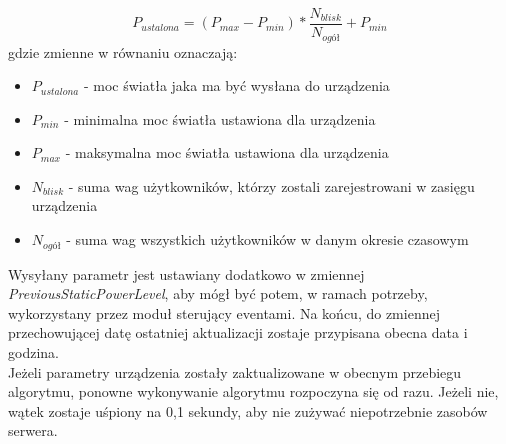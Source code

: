 \begin{equation}
P_{ustalona} = (P_{max} - P_{min}) * \frac{N_{blisk}}{N_{ogół}} + P_{min}
\end{equation}
gdzie zmienne w równaniu oznaczają:
\begin{itemize}
	\item $P_{ustalona}$ - moc światła jaka ma być wysłana do urządzenia
	\item $P_{min}$ - minimalna moc światła ustawiona dla urządzenia
	\item $P_{max}$ - maksymalna moc światła ustawiona dla urządzenia
	\item $N_{blisk}$ - suma wag użytkowników, którzy zostali zarejestrowani w zasięgu urządzenia
	\item $N_{ogół}$ - suma wag wszystkich użytkowników w danym okresie czasowym
\end{itemize}
Wysyłany parametr jest ustawiany dodatkowo w zmiennej \textit{PreviousStaticPowerLevel}, aby mógł być potem, w ramach potrzeby, wykorzystany przez moduł sterujący eventami. Na końcu, do zmiennej przechowującej datę ostatniej aktualizacji zostaje przypisana obecna data i godzina.\\
Jeżeli parametry urządzenia zostały zaktualizowane w obecnym przebiegu algorytmu, ponowne wykonywanie algorytmu rozpoczyna się od razu. Jeżeli nie, wątek zostaje uśpiony na 0,1 sekundy, aby nie zużywać niepotrzebnie zasobów serwera.
